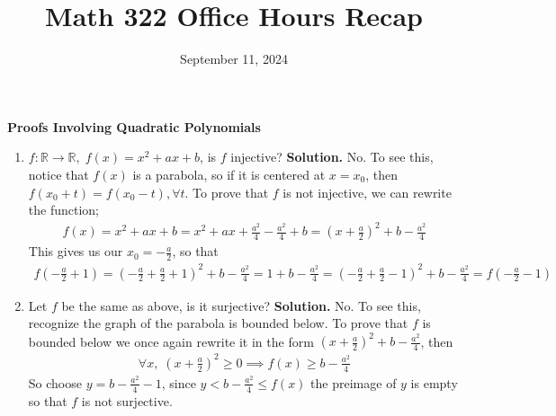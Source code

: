 \documentclass[10.5pt]{article}
\title{\vspace{-2cm} Math 322 Office Hours Recap}
\date{September 11, 2024}
\theoremstyle{definition}
\begin{document}
    \maketitle
    
    \textbf{Proofs Involving Quadratic Polynomials}

    \begin{enumerate}
        \item \(f: \mathbb{R} \to \mathbb{R}, \; f(x) = x^2 + ax + b\), is \(f\) injective? \newline
        \textbf{Solution.} No. To see this, notice that \(f(x)\) is a parabola, so if it is centered at \(x = x_0\), then \(f(x_0 + t) = f(x_0 - t), \forall t\).
        To prove that \(f\) is not injective, we can rewrite the function;
        \begin{align*}
            f(x) = x^2 + ax + b = x^2 + ax + \frac{a^2}{4} - \frac{a^2}{4} + b = \left(x+\frac{a}{2}\right)^2 + b - \frac{a^2}{4}
        \end{align*}
        This gives us our \(x_0 = -\frac{a}{2}\), so that
        \begin{align*}
            f\left(-\frac{a}{2} + 1\right) = \left(-\frac{a}{2}+\frac{a}{2} + 1\right)^2 + b - \frac{a^2}{4} = 1 + b - \frac{a^2}{4} = \left(-\frac{a}{2}+\frac{a}{2} - 1\right)^2 + b - \frac{a^2}{4}
            = f\left(-\frac{a}{2} - 1\right)
        \end{align*}

        \item Let \(f\) be the same as above, is it surjective? \newline
        \textbf{Solution.} No. To see this, recognize the graph of the parabola is bounded below.
        To prove that \(f\) is bounded below we once again rewrite it in the form \(\left(x+\frac{a}{2}\right)^2 + b - \frac{a^2}{4}\), then
        \begin{align*}
            \forall x, \; \left(x+\frac{a}{2}\right)^2 \geq 0 \implies f(x) \geq b - \frac{a^2}{4}
        \end{align*}
        So choose \(y = b - \frac{a^2}{4} - 1\), since \(y < b - \frac{a^2}{4} \leq f(x)\) the preimage of \(y\) is empty so that \(f\) is not surjective.


\end{enumerate}
\end{document}

